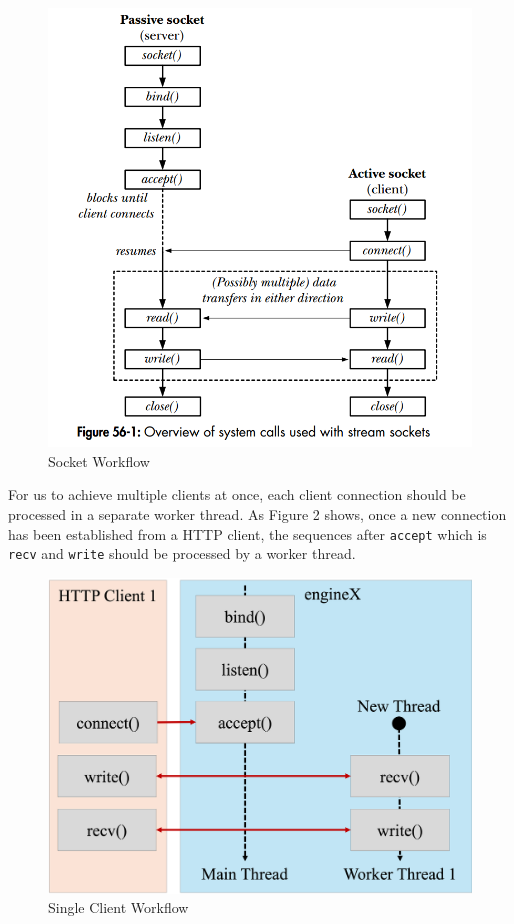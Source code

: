 \documentclass{homework}
\begin{document}
\pagebreak
\begin{figure}[h]
\begin{center}
\includegraphics[scale=0.35]{1_socket_flow.png}    
\caption{Socket Workflow}
\end{center}
\end{figure}

For us to achieve multiple clients at once, each client connection should be processed in a separate worker thread. As Figure 2 shows, once a new connection has been established from a HTTP client, the sequences after \texttt{accept} which is \texttt{recv} and \texttt{write} should be processed by a worker thread. 

\begin{figure}[h]
\begin{center}
\includegraphics[scale=0.30]{2_single_client.png}    
\caption{Single Client Workflow}
\end{center}
\end{figure}
\end{document}
